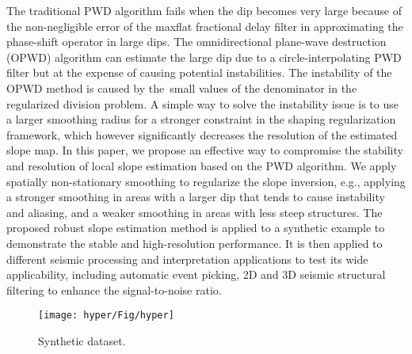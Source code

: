 The traditional PWD algorithm fails when the dip becomes very large because of the non-negligible error of the maxflat fractional delay filter in approximating the phase-shift operator in large dips. The omnidirectional plane-wave destruction (OPWD) algorithm can estimate the large dip due to a circle-interpolating PWD filter but at the expense of causing potential instabilities. The instability of the OPWD method is caused by the small values of the denominator in the regularized division problem. A simple way to solve the instability issue is to use a larger smoothing radius for a stronger constraint in the shaping regularization framework, which however significantly decreases the resolution of the estimated slope map. In this paper, we propose an effective way to compromise the stability and resolution of local slope estimation based on the PWD algorithm. We apply spatially non-stationary smoothing to regularize the slope inversion, e.g., applying a stronger smoothing in areas with a larger dip that tends to cause instability and aliasing, and a weaker smoothing in areas with less steep structures. The proposed robust slope estimation method is applied to a synthetic example to demonstrate the stable and high-resolution performance. It is then applied to different seismic processing and interpretation applications to test its wide applicability, including automatic event picking, 2D and 3D seismic structural filtering to enhance the signal-to-noise ratio. 

\begin{figure}[htb!]
\centering
\texttt{[image: hyper/Fig/hyper]}
\caption{Synthetic dataset. }
\label{fig:hyper}
\end{figure}


